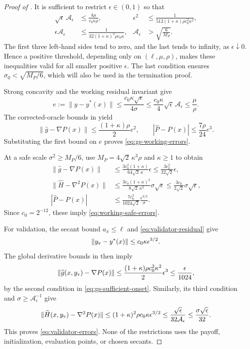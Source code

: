 \documentclass{article}
\begin{document}
\begin{proof}[Proof of ]
It is sufficient to restrict $\epsilon\in(0,1)$ so that
\begin{equation}\label{eq:gs-sufficient-onset}
\begin{aligned}
 \sqrt\epsilon\,\mathcal A_\epsilon
 &\le\frac{4\mu}{c_0\kappa\rho},
 &\epsilon^2
 &\le\frac1{512(1+\kappa)\rho c_0^2\kappa^2},\\
 \epsilon\mathcal A_\epsilon
 &\le\frac1{32(1+\kappa)^2\rho c_0\kappa},
 &\mathcal A_\epsilon
 &>\sqrt{\frac6{M_P}}.
\end{aligned}
\end{equation}
The first three left-hand sides tend to zero, and the last tends to
infinity, as $\epsilon\downarrow0$.  Hence a positive threshold,
depending only on $(\ell,\mu,\rho)$, makes these inequalities valid
for all smaller positive $\epsilon$.  The last condition ensures
$\sigma_0<\sqrt{M_P/6}$, which will also be used in the termination
proof.

Strong concavity and the working residual invariant give
\[
 e:=\|y-y^*(x)\|
 \le\frac{c_0\kappa\sqrt\epsilon}{4\sigma}
 \le\frac{c_0\kappa}{4}\sqrt\epsilon\,\mathcal A_\epsilon
 \le\frac\mu\rho.
\]
The corrected-oracle bounds in  yield
\[
 \|\widehat g-\nabla P(x)\|
 \le\frac{(1+\kappa)\rho}{2}e^2,\qquad
 |\widehat P-P(x)|\le\frac{7\rho}{24}e^3.
\]
Substituting the first bound on $e$ proves
\eqref{eq:gs-working-errors}.

At a safe scale $\sigma^2\ge M_P/6$, use
$M_P=4\sqrt2\,\kappa^3\rho$ and $\kappa\ge1$ to obtain
\begin{align*}
 \|\widehat g-\nabla P(x)\|
 &\le\frac{3c_0^2(1+\kappa)}{64\sqrt2\,\kappa}\epsilon
 \le\frac{3c_0^2}{32\sqrt2}\epsilon,\\
 \|\widehat H-\nabla^2P(x)\|
 &\le\frac{3c_0(1+\kappa)^2}{8\sqrt2\,\kappa^2}
                      \sigma\sqrt\epsilon
 \le\frac{3c_0}{2\sqrt2}\sigma\sqrt\epsilon,\\
 |\widehat P-P(x)|
 &\le\frac{7c_0^3}{1024\sqrt2}
                        \frac{\epsilon^{3/2}}{\sigma}.
\end{align*}
Since $c_0=2^{-12}$, these imply
\eqref{eq:working-safe-errors}.

For validation, the secant bound $a_x\le\ell$ and
\eqref{eq:validator-residual} give
\[
 \|y_{\rm v}-y^*(x)\|\le c_0\kappa\epsilon^{3/2}.
\]
The global derivative bounds in  then imply
\[
 \|\widehat g(x,y_{\rm v})-\nabla P(x)\|
 \le\frac{(1+\kappa)\rho c_0^2\kappa^2}{2}\epsilon^3
 \le\frac{\epsilon}{1024},
\]
by the second condition in \eqref{eq:gs-sufficient-onset}.  Similarly,
its third condition and $\sigma\ge\mathcal A_\epsilon^{-1}$ give
\[
 \|\widehat H(x,y_{\rm v})-\nabla^2P(x)\|
 \le(1+\kappa)^2\rho c_0\kappa\epsilon^{3/2}
 \le\frac{\sqrt\epsilon}{32\mathcal A_\epsilon}
 \le\frac{\sigma\sqrt\epsilon}{32}.
\]
This proves \eqref{eq:validator-errors}.  None of the restrictions
uses the payoff, initialization, evaluation points, or chosen secants.
\end{proof}
\end{document}
